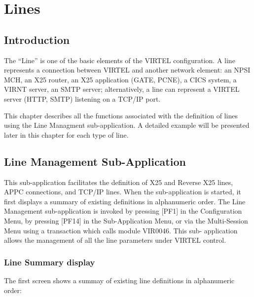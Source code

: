 \documentclass[letterpaper,10pt,english]{sphinxmanual}
\begin{document}
\chapter{Lines}
\label{\detokenize{connectivity_guide:lines}}

\section{Introduction}
\label{\detokenize{connectivity_guide:introduction}}
The “Line” is one of the basic elements of the VIRTEL configuration. A line represents a connection between VIRTEL and another network element: an NPSI MCH, an X25 router, an X25 application (GATE, PCNE), a CICS system, a VIRNT server, an SMTP server; alternatively, a line can represent a VIRTEL server (HTTP, SMTP) listening on a TCP/IP port.

This chapter describes all the functions associated with the definition of lines using the Line Managment sub-application. A detailed example will be presented later in
this chapter for each type of line.


\section{Line Management Sub-Application}
\label{\detokenize{connectivity_guide:line-management-sub-application}}
This sub-application facilitates the definition of X25 and Reverse X25 lines, APPC connections, and TCP/IP lines. When the sub-application is started, it first displays a summary of existing definitions in alphanumeric order. The Line Management sub-application is invoked by pressing {[}PF1{]} in the Configuration Menu, by pressing {[}PF14{]} in the Sub-Application Menu, or via the Multi-Session Menu using a transaction which calls module VIR0046. This sub- application allows the management of all the line parameters under VIRTEL control.


\subsection{Line Summary display}
\label{\detokenize{connectivity_guide:line-summary-display}}
The first screen shows a summay of existing line definitions in alphanumeric order:

\end{document}
